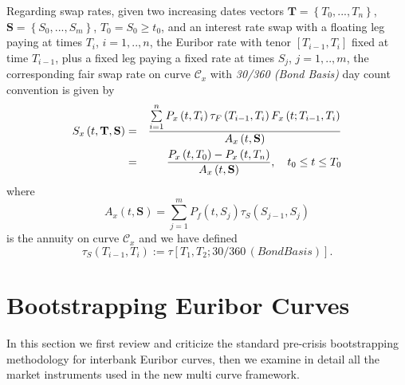 \documentclass[11pt,reqno]{amsart}
\begin{document}
\par
Regarding swap rates, given two increasing dates vectors 
$\mathbf{T=}\left\{T_{0},...,T_{n}\right\}$, 
$\mathbf{S=}\left\{S_{0},...,S_{m}\right\}$, $T_{0}=S_{0}\geq t_0$, and an interest rate swap with a floating leg paying at times $T_{i}$, $i=1,..,n$, the Euribor rate with tenor 
$\left[T_{i-1},T_{i}\right]$ fixed at time $T_{i-1}$, plus a fixed leg paying a fixed rate at times $S_{j}$, $j=1,..,m$, the corresponding fair swap rate on curve $\mathcal{C}_{x}$ with \emph{30/360 (Bond Basis)} day count convention is given by
\begin{eqnarray}
S_{x}\left(t,\mathbf{T},\mathbf{S}\right) 
&=& \frac{\sum\limits_{i=1}^{n}P_{x}\left(t,T_{i}\right) \tau_F\left(T_{i-1},T_{i}\right) F_{x}\left(t;T_{i-1},T_{i}\right)}{A_{x}\left(t,\mathbf{S}\right)} \notag \\
&=& \frac{P_{x}\left(t,T_0\right) - P_{x}\left(t,T_n\right)}{A_{x}\left(t,\mathbf{S}\right)}
,\quad t_0\leq t\leq T_{0}
\label{eqn:SwapRateFwd}
\end{eqnarray}
where
\begin{equation}
A_{x}\left(t,\mathbf{S}\right) 
= \sum\limits_{j=1}^{m}P_{f}\left(t,S_{j}\right) \tau_S\left(S_{j-1},S_{j}\right)
\end{equation}
is the annuity on curve $\mathcal{C}_{x}$ and we have defined
\begin{equation}
\tau_S\left(T_{i-1},T_{i}\right)
:= \tau\left[T_{1},T_{2};30/360\,(Bond Basis)\right].
\end{equation}

\section{\label{SecBootstrapping}Bootstrapping Euribor Curves}
In this section we first review and criticize the standard pre-crisis bootstrapping methodology for interbank Euribor curves, then we examine in detail all the market instruments used in the new multi curve framework.
\end{document}
